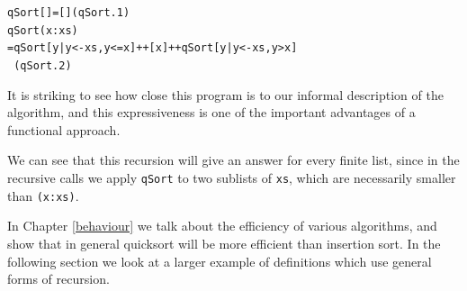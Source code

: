 \begin{example}
\begin{alltt}
qSort [] = []\hfill(qSort.1)
qSort (x:xs) 
  = qSort [ y | y<-xs , y<=x] ++ [x] ++ qSort [ y | y<-xs , y>x]
\ \hfill(qSort.2)
\end{alltt}
It is striking to see how close this program is to our informal
description of the algorithm, and this expressiveness is one 
of the important advantages of a functional approach.
 
We can see that this recursion will give an answer for every finite
list, since in the recursive calls we apply \texttt{qSort} to two
sublists of \texttt{xs}, which are necessarily smaller than
\texttt{(x:xs)}.


In Chapter \ref{behaviour} we talk about the efficiency of various
algorithms, and show that in general quicksort will be more efficient
than insertion sort.
In the following section we look at a larger example of definitions
which use general forms of recursion.
\end{example}

